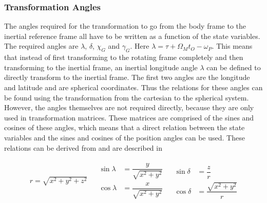 \subsubsection{Transformation Angles}
\label{subsubsec:tsiTransAngl}
The angles required for the transformation to go from the body frame to the inertial reference frame all have to be written as a function of the state variables. The required angles are $\lambda$, $\delta$, $\chi_{G}$ and $\gamma_{G}$. Here $\lambda = \tau + \Omega_{M}t_{O}-\omega_{P}$. This means that instead of first transforming to the rotating frame completely and then transforming to the inertial frame, an inertial longitude angle $\lambda$ can be defined to directly transform to the inertial frame. The first two angles are the longitude and latitude and are spherical coordinates. Thus the relations for these angles can be found using the transformation from the cartesian to the spherical system. However, the angles themselves are not required directly, because they are only used in transformation matrices. These matrices are comprised of the sines and cosines of these angles, which means that a direct relation between the state variables and the sines and cosines of the position angles can be used. These relations can be derived from  and are described in 



\begin{align} \label{eq:transAngl}
\begin{split}
r = \sqrt{x^{2}+y^{2}+z^{2}}\\
\end{split}
&
\begin{split}
\sin \lambda &= \dfrac{y}{\sqrt{x^{2}+y^{2}}}\\
\cos \lambda &= \dfrac{x}{\sqrt{x^{2}+y^{2}}}\\
\end{split}
&
\begin{split}
\sin \delta &= \dfrac{z}{r}\\
\cos \delta &= \dfrac{\sqrt{x^{2}+y^{2}}}{r}
\end{split} 
\end{align} 

